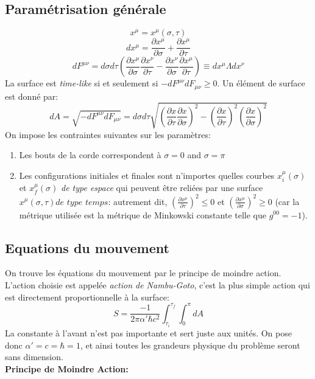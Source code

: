 \documentclass[a4paper,12pt]{article}
\begin{document}
\subsection{Paramétrisation générale}
$$x^{\mu}=x^{\mu}(\sigma,\tau)$$
$$dx^{\mu}=\frac{\partial x^{\mu}}{\partial \sigma}+\frac{\partial x^{\mu}}{\partial \tau}$$
$$dF^{\mu \nu}=d\sigma d\tau \left( \frac{\partial x^{\mu}}{\partial \sigma}\frac{\partial x^{\nu}}{\partial \tau}-\frac{\partial x^{\nu}}{\partial \sigma}\frac{\partial x^{\mu}}{\partial \tau}\right)\equiv dx^{\mu}\Lambda dx^{\nu}$$
La surface est \textit{time-like} si et seulement si $-dF^{\mu \nu}dF_{\mu \nu}\geq0$.
Un élément de surface est donné par:
$$dA=\sqrt{-dF^{\mu \nu}dF_{\mu \nu}}=d\sigma d\tau \sqrt{\left( \frac{\partial x}{\partial \tau}\frac{\partial x}{\partial \sigma}\right)^{2}-\left( \frac{\partial x}{\partial \tau}\right) ^{2}\left( \frac{\partial x}{\partial \sigma}\right) ^{2}}$$
On impose les contraintes suivantes sur les paramètres:
\begin{enumerate}
\item Les bouts de la corde correspondent à $\sigma=0$ and $\sigma=\pi$
\item Les configurations initiales et finales sont n'importes quelles courbes $x^{\mu}_{i}(\sigma)$ et $x^{\mu}_{f}(\sigma)$  \textit{de type espace} qui peuvent être reliées par une surface $x^{\mu}(\sigma,\tau) \textit{de type temps}$:
autrement dit, $\left( \frac{\partial x^{\mu}}{\partial \tau}\right)^{2}\leq 0 $ et $\left( \frac{\partial x^{\mu}}{\partial \sigma}\right)^{2}\geq 0 $ (car la métrique utilisée est la métrique de Minkowski constante telle que $g^{00}=-1$).
\end{enumerate}
\subsection{Equations du mouvement}
On trouve les équations du mouvement par le principe de moindre action. L'action choisie est appelée \textit{action de Nambu-Goto}, c'est la plus simple action qui est directement proportionnelle à la surface:
\begin{equation}
S=\frac{-1}{2\pi \alpha'\hbar c^{2}}\int_{\tau_{i}}^{\tau_{f}}\int_{0}^{\pi}dA
\end{equation} 
La constante à l'avant n'est pas importante et sert juste aux unités. On pose donc $\alpha '=c=\hbar =1$, et ainsi toutes les grandeurs physique du problème seront sans dimension.\\
\textbf{Principe de Moindre Action:} 
\end{document}

